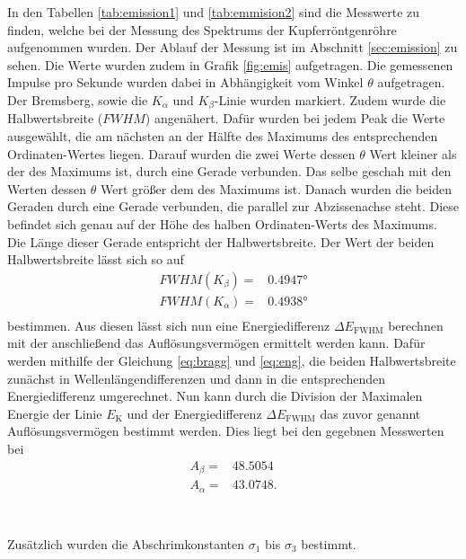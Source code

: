 In den Tabellen \ref{tab:emission1} und \ref{tab:emmision2} sind die Messwerte zu finden, welche bei der Messung des Spektrums der Kupferröntgenröhre aufgenommen wurden.
Der Ablauf der Messung ist im Abschnitt \ref{sec:emission} zu sehen.
Die Werte wurden zudem in Grafik \ref{fig:emis} aufgetragen.
Die gemessenen Impulse pro Sekunde wurden dabei in Abhängigkeit vom Winkel $\theta$ aufgetragen.
Der Bremsberg, sowie die $K_\alpha$ und $K_\beta$-Linie wurden markiert.
Zudem wurde die Halbwertsbreite ($FWHM$) angenähert.
Dafür wurden bei jedem Peak die Werte ausgewählt, die am nächsten an der Hälfte des Maximums des entsprechenden Ordinaten-Wertes liegen.
Darauf wurden die zwei Werte dessen $\theta$ Wert kleiner als der des Maximums ist, durch eine Gerade verbunden.
Das selbe geschah mit den Werten dessen $\theta$ Wert größer dem des Maximums ist.
Danach wurden die beiden Geraden durch eine Gerade verbunden, die parallel zur Abzissenachse steht.
Diese befindet sich genau auf der Höhe des halben Ordinaten-Werts des Maximums.
Die Länge dieser Gerade entspricht der Halbwertsbreite.
Der Wert der beiden Halbwertsbreite lässt sich so auf
\begin{align*}
    FWHM(K_\beta) = & 0.4947 \si{\degree} \\
    FWHM(K_\alpha) = & 0.4938 \si{\degree} \\
\end{align*}
bestimmen.
Aus diesen lässt sich nun eine Energiedifferenz $\Delta E_\text{FWHM}$ berechnen mit der anschließend das Auflösungsvermögen ermittelt werden kann.
Dafür werden mithilfe der Gleichung \eqref{eq:bragg} und \eqref{eq:eng}, die beiden Halbwertsbreite zunächst in Wellenlängendifferenzen und dann in die entsprechenden Energiedifferenz umgerechnet.
Nun kann durch die Division der Maximalen Energie der Linie $E_\text{K}$ und der Energiedifferenz $\Delta E_\text{FWHM}$ das zuvor genannt Auflösungsvermögen bestimmt werden.
Dies liegt bei den gegebnen Messwerten bei 
\begin{align*}
    A_\beta = & 48.5054 \\
    A_\alpha = & 43.0748. \\
\end{align*}
\\\\
Zusätzlich wurden die Abschrimkonstanten $\sigma_1$ bis $\sigma_3$ bestimmt.


